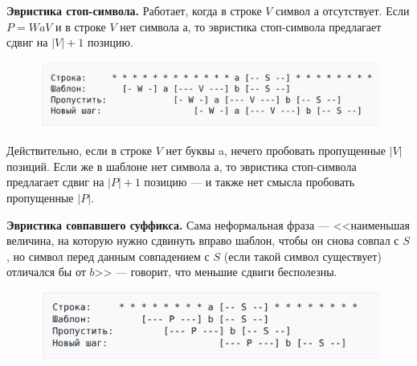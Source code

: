 \textbf{Эвристика стоп-символа.} 
Работает, когда в строке $V$ символ $а$ отсутствует. Если $P=WaV$ и в строке $V$ нет символа а, то эвристика стоп-символа предлагает сдвиг на $|V|+1$ позицию.

\begin{figure}[h!]
	\centering
	\includegraphics[width=0.8\linewidth]{img/10_6.png}
	\captionsetup{labelformat=empty}
	\caption{\textbf{}}
\end{figure}

Действительно, если в строке $V$ нет буквы a, нечего пробовать пропущенные $|V|$ позиций.
Если же в шаблоне нет символа а, то эвристика стоп-символа предлагает сдвиг на $|P|+1$ позицию — и также нет смысла пробовать пропущенные $|P|$.

\textbf{Эвристика совпавшего суффикса. }
Сама неформальная фраза — <<наименьшая величина, на которую нужно сдвинуть вправо шаблон, чтобы он снова совпал с $S$, но символ перед данным совпадением с $S$ (если такой символ существует) отличался бы от $b$>> — говорит, что меньшие сдвиги бесполезны.

\begin{figure}[h!]
	\centering
	\includegraphics[width=0.8\linewidth]{img/10_7.png}
	\captionsetup{labelformat=empty}
	\caption{\textbf{}}
\end{figure}

